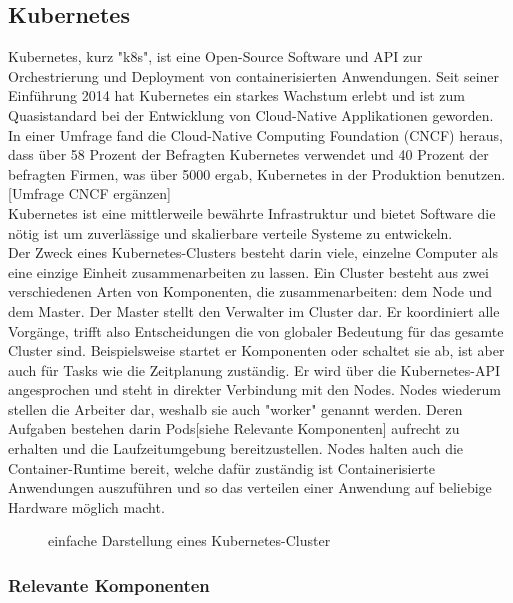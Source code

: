 \documentclass[a4paper,12pt]{scrartcl}
\begin{document}
\subsection{Kubernetes}

Kubernetes, kurz "k8s", ist eine Open-Source Software und API zur Orchestrierung und Deployment von containerisierten Anwendungen. Seit seiner Einführung 2014 hat Kubernetes ein starkes Wachstum erlebt und ist zum Quasistandard bei der Entwicklung von Cloud-Native Applikationen geworden.\\

In einer Umfrage fand die Cloud-Native Computing Foundation (CNCF) heraus, dass über 58 Prozent der Befragten Kubernetes verwendet und 40 Prozent der befragten Firmen, was über 5000 ergab, Kubernetes in der Produktion benutzen.[Umfrage CNCF ergänzen]\\


Kubernetes ist eine mittlerweile bewährte Infrastruktur und bietet Software die nötig ist um zuverlässige und skalierbare verteile Systeme zu entwickeln. \cite{Burns.2019}\\
Der Zweck eines Kubernetes-Clusters besteht darin viele, einzelne Computer als eine einzige Einheit zusammenarbeiten zu lassen.
Ein Cluster besteht aus zwei verschiedenen Arten von Komponenten, die zusammenarbeiten:
dem Node und dem Master.
Der Master stellt den Verwalter im Cluster dar. Er koordiniert alle Vorgänge, trifft also Entscheidungen die von globaler Bedeutung für das gesamte Cluster sind. Beispielsweise startet er Komponenten oder schaltet sie ab, ist aber auch für Tasks wie die Zeitplanung zuständig. Er wird über die Kubernetes-API angesprochen und steht in direkter Verbindung mit den Nodes.\cite{.20200530T15:19:3404:00} \cite{.20200316T05:14:35+01:00}
Nodes wiederum stellen die Arbeiter dar, weshalb sie auch "worker" genannt werden. Deren Aufgaben bestehen darin Pods[siehe Relevante Komponenten] aufrecht zu erhalten und die Laufzeitumgebung bereitzustellen. Nodes halten auch die Container-Runtime bereit, welche dafür zuständig ist Containerisierte Anwendungen auszuführen und so das verteilen einer Anwendung auf beliebige Hardware möglich macht.

\begin{figure}[htbp]
  \centering
  
  \caption{einfache Darstellung eines Kubernetes-Cluster}
\end{figure}

\subsubsection{Relevante Komponenten}
\end{document}
